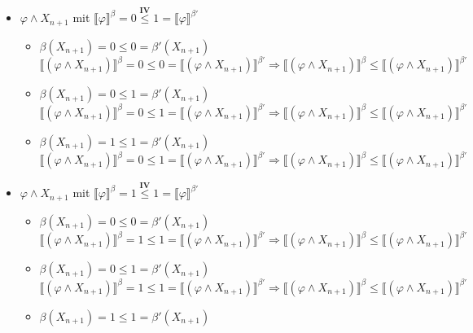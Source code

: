 \documentclass[a4paper,10pt]{article}
\begin{document}
\begin{itemize}
\begin{itemize}
\begin{itemize}
\end{itemize}
\item $\varphi \land X_{n+1}$ mit $\llbracket \varphi \rrbracket^{\beta} = 0 \stackrel{\textbf{IV}}{\leq} 1 = \llbracket \varphi \rrbracket^{\beta'}$ 
\begin{itemize}
\item $\beta(X_{n+1}) = 0 \leq 0 = \beta'(X_{n+1})$ \\
$\llbracket (\varphi \land X_{n+1}) \rrbracket^{\beta} = 0 \leq 0 = \llbracket (\varphi \land X_{n+1})  \rrbracket^{\beta'} \Rightarrow \llbracket (\varphi \land X_{n+1})  \rrbracket^{\beta} \leq \llbracket (\varphi \land X_{n+1})  \rrbracket^{\beta'} $
\item $\beta(X_{n+1}) = 0 \leq 1 = \beta'(X_{n+1})$ \\
$\llbracket (\varphi \land X_{n+1}) \rrbracket^{\beta} = 0 \leq 1 = \llbracket (\varphi \land X_{n+1})  \rrbracket^{\beta'} \Rightarrow \llbracket (\varphi \land X_{n+1})  \rrbracket^{\beta} \leq \llbracket (\varphi \land X_{n+1})  \rrbracket^{\beta'} $
\item $\beta(X_{n+1}) = 1 \leq 1 = \beta'(X_{n+1})$ \\
$\llbracket (\varphi \land X_{n+1}) \rrbracket^{\beta} = 0 \leq 1 = \llbracket (\varphi \land X_{n+1})  \rrbracket^{\beta'} \Rightarrow \llbracket (\varphi \land X_{n+1})  \rrbracket^{\beta} \leq \llbracket (\varphi \land X_{n+1})  \rrbracket^{\beta'} $
\end{itemize}
\item $\varphi \land X_{n+1}$ mit $\llbracket \varphi \rrbracket^{\beta} = 1 \stackrel{\textbf{IV}}{\leq} 1 = \llbracket \varphi \rrbracket^{\beta'}$ 
\begin{itemize}
\item $\beta(X_{n+1}) = 0 \leq 0 = \beta'(X_{n+1})$ \\
$\llbracket (\varphi \land X_{n+1}) \rrbracket^{\beta} = 1 \leq 1 = \llbracket (\varphi \land X_{n+1})  \rrbracket^{\beta'} \Rightarrow \llbracket (\varphi \land X_{n+1})  \rrbracket^{\beta} \leq \llbracket (\varphi \land X_{n+1})  \rrbracket^{\beta'} $
\item $\beta(X_{n+1}) = 0 \leq 1 = \beta'(X_{n+1})$ \\
$\llbracket (\varphi \land X_{n+1}) \rrbracket^{\beta} = 1 \leq 1 = \llbracket (\varphi \land X_{n+1})  \rrbracket^{\beta'} \Rightarrow \llbracket (\varphi \land X_{n+1})  \rrbracket^{\beta} \leq \llbracket (\varphi \land X_{n+1})  \rrbracket^{\beta'} $
\item $\beta(X_{n+1}) = 1 \leq 1 = \beta'(X_{n+1})$ \\

\end{itemize}
\end{itemize}
\end{itemize}
\end{document}
